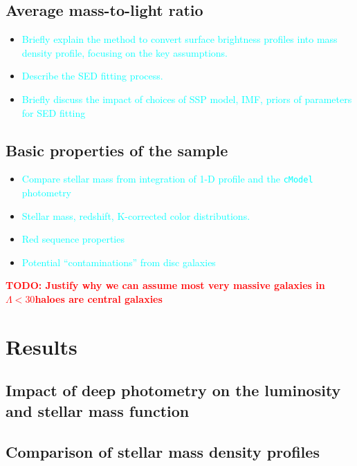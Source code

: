 \documentclass[preprint]{aastex}
\def\nonbcg{$\Lambda < 30$}
\newcommand{\todo}[1]{\textcolor{red}{\textbf{TODO: #1}}}
\newcommand{\plan}[1]{\textcolor{cyan}{#1}}
\begin{document}
\begin{CJK*}{UTF8}{gbsn}
\subsection{Average mass-to-light ratio}

    \begin{itemize}
        \item \plan{Briefly explain the method to convert surface brightness profiles 
            into mass density profile, focusing on the key assumptions.}
        \item \plan{Describe the SED fitting process.}    
        \item \plan{Briefly discuss the impact of choices of SSP model, IMF, priors of 
            parameters for SED fitting}
    \end{itemize}

\subsection{Basic properties of the sample}

    \begin{itemize}
        \item \plan{Compare stellar mass from integration of 1-D profile and the 
            \texttt{cModel} photometry}
        \item \plan{Stellar mass, redshift, K-corrected color distributions.}
        \item \plan{Red sequence properties}    
        \item \plan{Potential ``contaminations'' from disc galaxies}
    \end{itemize}
    
    \todo{Justify why we can assume most very massive galaxies in \nonbcg haloes are
        central galaxies}


\section{Results}

\subsection{Impact of deep photometry on the luminosity and stellar mass function}

\subsection{Comparison of stellar mass density profiles}


\end{CJK*}
\end{document}
